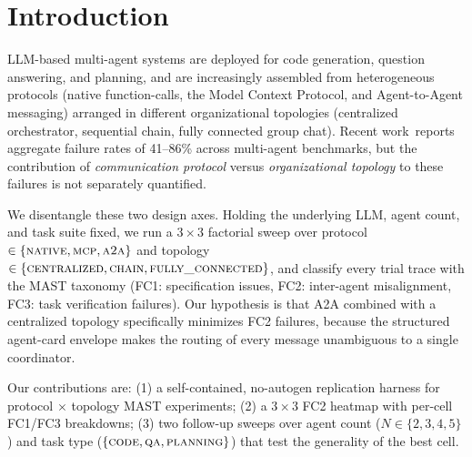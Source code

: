\section{Introduction}

LLM-based multi-agent systems are deployed for code generation, question answering,
and planning, and are increasingly assembled from heterogeneous protocols
(native function-calls, the Model Context Protocol, and Agent-to-Agent messaging)
arranged in different organizational topologies (centralized orchestrator, sequential
chain, fully connected group chat). Recent work\,\cite{scaling_agents_2025} reports
aggregate failure rates of 41--86\% across multi-agent benchmarks, but the
contribution of \emph{communication protocol} versus \emph{organizational topology}
to these failures is not separately quantified.

We disentangle these two design axes. Holding the underlying LLM, agent count, and
task suite fixed, we run a $3 \times 3$ factorial sweep over protocol
$\in \{\textsc{native}, \textsc{mcp}, \textsc{a2a}\}$ and topology
$\in \{\textsc{centralized}, \textsc{chain}, \textsc{fully\_connected}\}$, and
classify every trial trace with the MAST taxonomy
(FC1: specification issues, FC2: inter-agent misalignment, FC3: task verification
failures). Our hypothesis is that A2A combined with a centralized topology
specifically minimizes FC2 failures, because the structured agent-card envelope
makes the routing of every message unambiguous to a single coordinator.

Our contributions are: (1) a self-contained, no-autogen replication harness for
protocol $\times$ topology MAST experiments; (2) a $3 \times 3$ FC2 heatmap with
per-cell FC1/FC3 breakdowns; (3) two follow-up sweeps over agent count
($N \in \{2,3,4,5\}$) and task type ($\{\textsc{code}, \textsc{qa},
\textsc{planning}\}$) that test the generality of the best cell.
